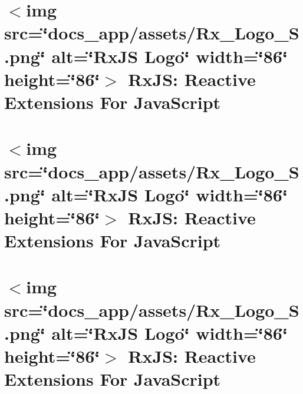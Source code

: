 \documentclass[twoside]{book}
\newcommand{\+}{\discretionary{\mbox{\scriptsize$\hookleftarrow$}}{}{}}
\begin{document}
\chapter{\texorpdfstring{$<$}{<}img src=\char`\"{}docs\+\_\+app/assets/\+Rx\+\_\+\+Logo\+\_\+\+S.\+png\char`\"{} alt=\char`\"{}\+Rx\+JS Logo\char`\"{} width=\char`\"{}86\char`\"{} height=\char`\"{}86\char`\"{}\texorpdfstring{$>$}{>} Rx\+JS\+: Reactive Extensions For Java\+Script}
\label{md__c___users_vaishnavi_jadhav__desktop__developer_code_mean_stack_example_client_node_modules__07e7beaee57f3d404c81480d4090999e}

\chapter{\texorpdfstring{$<$}{<}img src=\char`\"{}docs\+\_\+app/assets/\+Rx\+\_\+\+Logo\+\_\+\+S.\+png\char`\"{} alt=\char`\"{}\+Rx\+JS Logo\char`\"{} width=\char`\"{}86\char`\"{} height=\char`\"{}86\char`\"{}\texorpdfstring{$>$}{>} Rx\+JS\+: Reactive Extensions For Java\+Script}
\label{md__c___users_vaishnavi_jadhav__desktop__developer_code_mean_stack_example_client_node_modules__10a9b4faba2b3eb505bd34ea3c8e548c}

\chapter{\texorpdfstring{$<$}{<}img src=\char`\"{}docs\+\_\+app/assets/\+Rx\+\_\+\+Logo\+\_\+\+S.\+png\char`\"{} alt=\char`\"{}\+Rx\+JS Logo\char`\"{} width=\char`\"{}86\char`\"{} height=\char`\"{}86\char`\"{}\texorpdfstring{$>$}{>} Rx\+JS\+: Reactive Extensions For Java\+Script}
\label{md__c___users_vaishnavi_jadhav__desktop__developer_code_mean_stack_example_client_node_modules__3af6a8e5836f68ff5feae8369dc85ddc}

\end{document}
